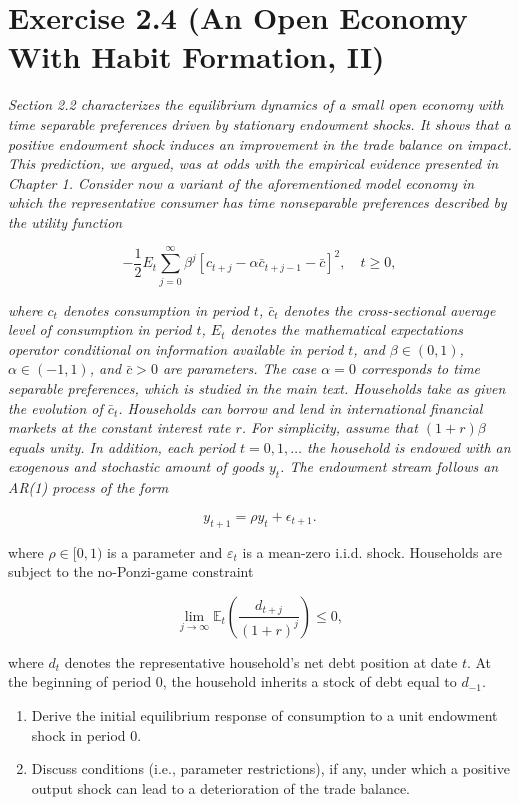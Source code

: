 \documentclass{article}
\begin{document}
\section*{Exercise 2.4 (An Open Economy With Habit Formation, II)} \textit{Section 2.2 characterizes the equilibrium dynamics of a small open economy with time separable preferences driven by stationary endowment shocks. It shows that a positive endowment shock induces an improvement in the trade balance on impact. This prediction, we argued, was at odds with the empirical evidence presented in Chapter 1. Consider now a variant of the aforementioned model economy in which the representative consumer has time nonseparable preferences described by the utility function}

\[
- \frac{1}{2} E_t \sum_{j=0}^{\infty} \beta^j [ c_{t+j} - \alpha \bar{c}_{t+j-1} - \bar{c} ]^2, \quad t \geq 0,
\]

\textit{where \( c_t \) denotes consumption in period \( t \), \( \bar{c}_t \) denotes the cross-sectional average level of consumption in period \( t \), \( E_t \) denotes the mathematical expectations operator conditional on information available in period \( t \), and \( \beta \in (0,1) \), \( \alpha \in (-1,1) \), and \( \bar{c} > 0 \) are parameters. The case \( \alpha = 0 \) corresponds to time separable preferences, which is studied in the main text. Households take as given the evolution of \( \bar{c}_t \). Households can borrow and lend in international financial markets at the constant interest rate \( r \). For simplicity, assume that \( (1+r)\beta \) equals unity. In addition, each period \( t = 0,1, \dots \) the household is endowed with an exogenous and stochastic amount of goods \( y_t \). The endowment stream follows an AR(1) process of the form}

\[
y_{t+1} = \rho y_t + \epsilon_{t+1}.
\]

where $\rho \in [0,1)$ is a parameter and $\varepsilon_t$ is a mean-zero i.i.d. shock. Households are subject to the no-Ponzi-game constraint

\[
\lim_{j \to \infty} \mathbb{E}_t \left( \frac{d_{t+j}}{(1 + r)^j} \right) \leq 0,
\]

where $d_t$ denotes the representative household’s net debt position at date $t$. At the beginning of period 0, the household inherits a stock of debt equal to $d_{-1}$.

\begin{enumerate}
    \item Derive the initial equilibrium response of consumption to a unit endowment shock in period 0.
    
    \item Discuss conditions (i.e., parameter restrictions), if any, under which a positive output shock can lead to a deterioration of the trade balance.
\end{enumerate}
\end{document}

